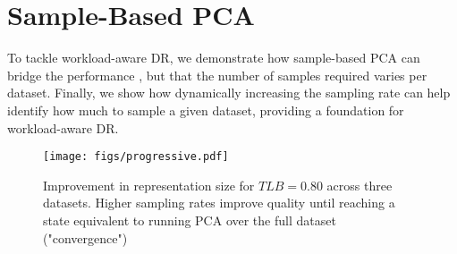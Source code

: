 \section{Sample-Based PCA}
\label{sec:sampling}

To tackle workload-aware DR, we demonstrate how sample-based PCA can bridge the performance , but that the number of samples required varies per dataset.
Finally, we show how dynamically increasing the sampling rate can help identify how much to sample a given dataset, providing a foundation for workload-aware DR.

\begin{figure}
\texttt{[image: figs/progressive.pdf]}
\caption[]{ Improvement in representation size for  $TLB = 0.80$ across three datasets. Higher sampling rates improve quality until reaching a state equivalent to running PCA over the full dataset ("convergence")}
\label{fig:progressive}
\end{figure}

